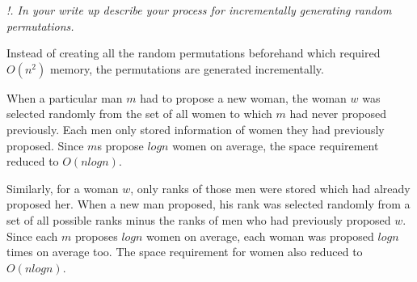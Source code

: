 \documentclass{homeworg}
\begin{document}
\emph{!. In your write up describe your process for incrementally generating random permutations.}

Instead of creating all the random permutations beforehand which required $O(n^2)$ memory, the permutations are generated incrementally.

When a particular man $m$ had to propose a new woman, the woman $w$ was selected randomly from the set of all women to which $m$ had never proposed previously. Each men only stored information of women they had previously proposed. Since $m$s propose $log n$ women on average, the space requirement reduced to $O(n logn)$. 

Similarly, for a woman $w$, only ranks of those men were stored which had already proposed her. When a new man proposed, his rank was selected randomly from a set of all possible ranks minus the ranks of men who had previously proposed $w$.  Since each $m$ proposes $log n$ women on average, each woman was proposed $log n$ times on average too. The space requirement for women also reduced to $O(n logn)$. 
\end{document}
